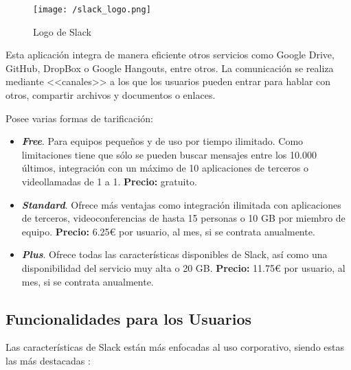 \begin{figure}[!h]
	\begin{center}
		\texttt{[image: /slack\_logo.png]}
		\caption{Logo de Slack}
		\label{fig:slack}
	\end{center}
\end{figure}

Esta aplicación integra de manera eficiente otros servicios como Google Drive, GitHub, DropBox o Google Hangouts, entre otros. La comunicación se realiza mediante <<canales>> a los que los usuarios pueden entrar para hablar con otros, compartir archivos y documentos o enlaces.

Posee varias formas de tarificación:

\begin{itemize}
	\item \textbf{\textit{Free}}. Para equipos pequeños y de uso por tiempo ilimitado. Como limitaciones tiene que sólo se pueden buscar mensajes entre los 10.000 últimos, integración con un máximo de 10 aplicaciones de terceros o videollamadas de 1 a 1. \textbf{Precio:} gratuito.
	\item \textbf{\textit{Standard}}. Ofrece más ventajas como integración ilimitada con aplicaciones de terceros, videoconferencias de hasta 15 personas o 10 \acs{GB} por miembro de equipo. \textbf{Precio:} 6.25\euro{} por usuario, al mes, si se contrata anualmente.
	\item \textbf{\textit{Plus}}. Ofrece todas las características disponibles de Slack, así como una disponibilidad del servicio muy alta o 20 \acs{GB}. \textbf{Precio:} 11.75\euro{} por usuario, al mes, si se contrata anualmente.
\end{itemize}

\subsection{Funcionalidades para los Usuarios}
Las características de Slack están más enfocadas al uso corporativo, siendo estas las más destacadas \cite{Slack2017}:

